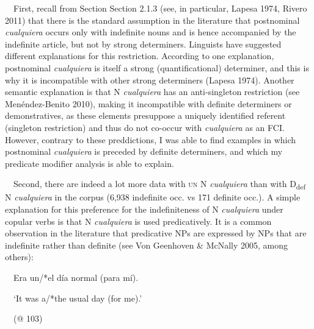 \begin{styleStandard}
\ \ First, recall from Section Section 2.1.3 (see, in particular, Lapesa 1974, Rivero 2011) that there is the standard assumption in the literature that postnominal \textit{cualquiera} occurs only with indefinite nouns and is hence accompanied by the indefinite article, but not by strong determiners. Linguists have suggested different explanations for this restriction. According to one explanation, postnominal \textit{cualquiera} is itself a strong (quantificational) determiner, and this is why it is incompatible with other strong determiners (Lapesa 1974). Another semantic explanation is that N \textit{cualquiera} has an anti-singleton restriction (see Menéndez-Benito 2010), making it incompatible with definite determiners or demonstratives, as these elements presuppose a uniquely identified referent (singleton restriction) and thus do not co-occur with \textit{cualquiera} as an FCI. However, contrary to these preddictions, I was able to find examples in which postnominal \textit{cualquiera} is preceded by definite determiners, and which my predicate modifier analysis is able to explain.
\end{styleStandard}

\begin{styleStandard}
\ \ Second, there are indeed a lot more data with \textsc{un} N \textit{cualquiera} than with D\textsubscript{def} N \textit{cualquiera} in the corpus (6,938 indefinite occ. vs 171 definite occ.). A simple explanation for this preference for the indefiniteness of N \textit{cualquiera} under copular verbs is that N \textit{cualquiera} is used predicatively. It is a common observation in the literature that predicative NPs are expressed by NPs that are indefinite rather than definite (see Von Geenhoven \& McNally 2005, among others): 
\end{styleStandard}

\begin{styleStandard}
\ \ Era un/*el día normal (para mí).
\end{styleStandard}

\begin{styleStandard}
\ \ ‘It was a/*the usual day (for me).’
\end{styleStandard}

\begin{styleStandard}
\ \ (@ 103)
\end{styleStandard}

